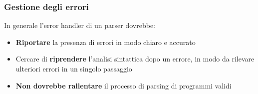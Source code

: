 \documentclass[a4paper]{article}
\begin{document}
\subsubsection{Gestione degli errori}
In generale l'error handler di un parser dovrebbe:
\begin{itemize}
  \item \textbf{Riportare} la presenza di errori in modo chiaro e accurato

  \item Cercare di \textbf{riprendere} l'analisi sintattica dopo un errore, in modo da
    rilevare ulteriori errori in un singolo passaggio

  \item \textbf{Non dovrebbe rallentare} il processo di parsing di programmi validi
\end{itemize}
\end{document}

